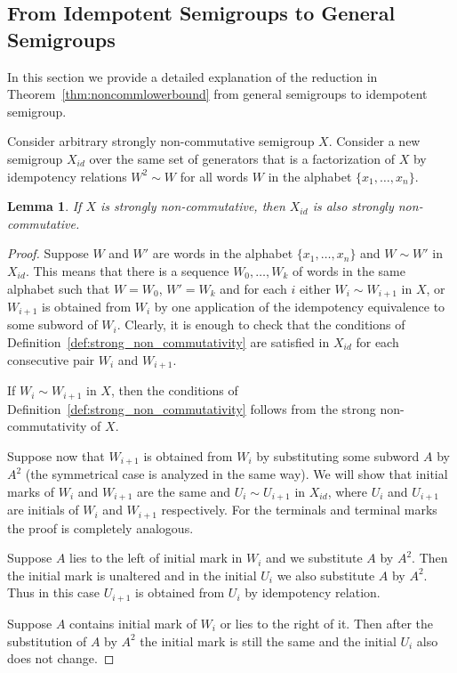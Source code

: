 \documentclass[11pt,letterpaper]{article}
\newtheorem{lemma}{Lemma}
\begin{document}
\subsection{From Idempotent Semigroups to General Semigroups}\label{sec:noncommutative_extension}

In this section we provide a detailed explanation of the reduction in Theorem~\ref{thm:noncommlowerbound} from general semigroups to idempotent semigroup.

Consider arbitrary strongly non-commutative semigroup $X$. Consider a new semigroup $X_{id}$ over the same set of generators that is a factorization of $X$ by idempotency relations $W^2\sim W$ for all words $W$ in the alphabet $\{x_1,\ldots, x_n\}$.

\begin{lemma} \label{lem:idempotisation}
If $X$ is strongly non-commutative, then $X_{id}$ is also strongly non-commutative.
\end{lemma}

\begin{proof}
Suppose $W$ and $W'$ are words in the alphabet $\{x_1,\ldots, x_n\}$ and $W \sim W'$ in $X_{id}$. This means that there is a sequence $W_0,\ldots, W_k$ of words in the same alphabet such that $W=W_0$, $W'=W_k$ and for each $i$ either $W_i \sim W_{i+1}$ in $X$, or $W_{i+1}$ is obtained from $W_i$ by one application of the idempotency equivalence to some subword of $W_i$. Clearly, it is enough to check that the conditions of Definition~\ref{def:strong_non_commutativity} are satisfied in $X_{id}$ for each consecutive pair $W_i$ and $W_{i+1}$.

If $W_i \sim W_{i+1}$ in $X$, then the conditions of Definition~\ref{def:strong_non_commutativity} follows from the strong non-commutativity of $X$.

Suppose now that $W_{i+1}$ is obtained from $W_{i}$ by substituting some subword $A$ by $A^2$ (the symmetrical case is analyzed in the same way). We will show that initial marks of $W_i$ and $W_{i+1}$ are the same and $U_{i} \sim U_{i+1}$ in $X_{id}$, where $U_{i}$ and $U_{i+1}$ are initials of $W_i$ and $W_{i+1}$ respectively. For the terminals and terminal marks the proof is completely analogous.

Suppose $A$ lies to the left of initial mark in $W_i$ and we substitute $A$ by $A^2$. Then the initial mark is unaltered and in the initial $U_i$ we also substitute $A$ by $A^2$. Thus in this case $U_{i+1}$ is obtained from $U_i$ by idempotency relation.

Suppose $A$ contains initial mark of $W_i$ or lies to the right of it. Then after the substitution of $A$ by $A^2$ the initial mark is still the same and the initial $U_i$ also does not change.
\end{proof}
\end{document}
